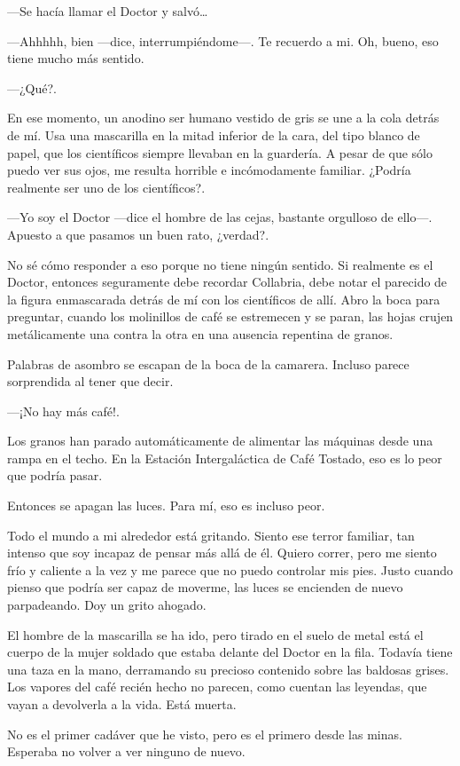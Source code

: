 ---Se hacía llamar el Doctor y salvó\ldots{}

---Ahhhhh, bien ---dice, interrumpiéndome---. Te recuerdo a mi. Oh,
bueno, eso tiene mucho más sentido.

---¿Qué?.

En ese momento, un anodino ser humano vestido de gris se une a la cola
detrás de mí. Usa una mascarilla en la mitad inferior de la cara, del
tipo blanco de papel, que los científicos siempre llevaban en la
guardería. A pesar de que sólo puedo ver sus ojos, me resulta horrible e
incómodamente familiar. ¿Podría realmente ser uno de los científicos?.

---Yo soy el Doctor ---dice el hombre de las cejas, bastante orgulloso
de ello---. Apuesto a que pasamos un buen rato, ¿verdad?.

No sé cómo responder a eso porque no tiene ningún sentido. Si realmente
es el Doctor, entonces seguramente debe recordar Collabria, debe notar
el parecido de la figura enmascarada detrás de mí con los científicos de
allí. Abro la boca para preguntar, cuando los molinillos de café se
estremecen y se paran, las hojas crujen metálicamente una contra la otra
en una ausencia repentina de granos.

Palabras de asombro se escapan de la boca de la camarera. Incluso parece
sorprendida al tener que decir.

---¡No hay más café!.

Los granos han parado automáticamente de alimentar las máquinas desde
una rampa en el techo. En la Estación Intergaláctica de Café Tostado,
eso es lo peor que podría pasar.

Entonces se apagan las luces. Para mí, eso es incluso peor.

Todo el mundo a mi alrededor está gritando. Siento ese terror familiar,
tan intenso que soy incapaz de pensar más allá de él. Quiero correr,
pero me siento frío y caliente a la vez y me parece que no puedo
controlar mis pies. Justo cuando pienso que podría ser capaz de moverme,
las luces se encienden de nuevo parpadeando. Doy un grito ahogado.

El hombre de la mascarilla se ha ido, pero tirado en el suelo de metal
está el cuerpo de la mujer soldado que estaba delante del Doctor en la
fila. Todavía tiene una taza en la mano, derramando su precioso
contenido sobre las baldosas grises. Los vapores del café recién hecho
no parecen, como cuentan las leyendas, que vayan a devolverla a la vida.
Está muerta.

No es el primer cadáver que he visto, pero es el primero desde las
minas. Esperaba no volver a ver ninguno de nuevo.